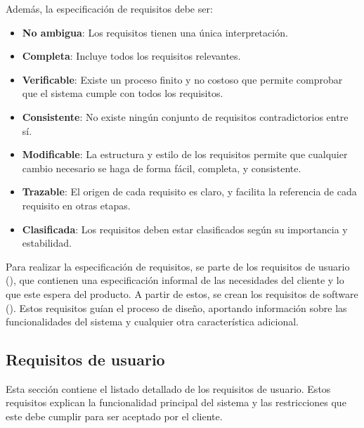\noindent
Además, la especificación de requisitos debe ser:

\begin{itemize}
    \item \textbf{No ambigua}: Los requisitos tienen una única interpretación.
    \item \textbf{Completa}: Incluye todos los requisitos relevantes.
    \item \textbf{Verificable}: Existe un proceso finito y no costoso que permite
    comprobar que el sistema cumple con todos los requisitos.
    \item \textbf{Consistente}: No existe ningún conjunto de requisitos contradictorios
    entre sí.
    \item \textbf{Modificable}: La estructura y estilo de los requisitos permite que
    cualquier cambio necesario se haga de forma fácil, completa, y consistente.
    \item \textbf{Trazable}: El origen de cada requisito es claro, y facilita la
    referencia de cada requisito en otras etapas.
    \item \textbf{Clasificada}: Los requisitos deben estar clasificados según su
    importancia y estabilidad.
\end{itemize}

Para realizar la especificación de requisitos, se parte de los requisitos de
usuario (), que contienen una especificación
informal de las necesidades del cliente y lo que este espera del producto. A
partir de estos, se crean los requisitos de software
(). Estos requisitos guían el proceso de
diseño, aportando información sobre las funcionalidades del sistema y cualquier
otra característica adicional.


\subsection{Requisitos de usuario}\label{subsec:user-requirements}

Esta sección contiene el listado detallado de los requisitos de usuario. Estos
requisitos explican la funcionalidad principal del sistema y las restricciones
que este debe cumplir para ser aceptado por el cliente.

